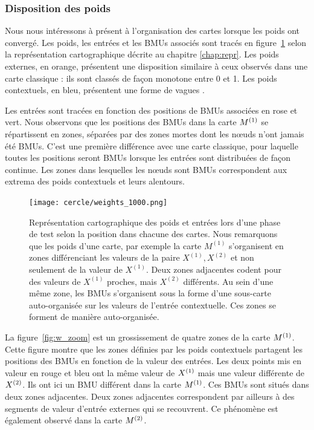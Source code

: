 \documentclass[../main]{subfiles}
\begin{document}
\subsubsection{Disposition des poids}

Nous nous intéressons à présent à l'organisation des cartes lorsque les poids ont convergé.
Les poids, les entrées et les BMUs associés sont tracés en figure~\ref{fig:w} selon la représentation cartographique décrite au chapitre \ref{chap:repr}.
Les poids externes, en orange, présentent une disposition similaire à ceux observés dans une carte classique : ils sont classés de façon monotone entre 0 et 1.
Les poids contextuels, en bleu, présentent une forme de \og vagues \fg{}. 

Les entrées sont tracées en fonction des positions de BMUs associées en rose et vert. 
Nous observons que les positions des BMUs dans la carte $M^{({1})}$ se répartissent en zones, séparées par des zones mortes dont les n\oe{}uds n'ont jamais été BMUs.
C'est une première différence avec une carte classique, pour laquelle toutes les positions seront BMUs lorsque les entrées sont distribuées de façon continue.
Les zones dans lesquelles les n\oe{}uds sont BMUs correspondent aux extrema des poids contextuels et leurs alentours.

\begin{figure}[h!]
	\centering\texttt{[image: cercle/weights\_1000.png]}
	\caption{Représentation cartographique des poids et entrées lors d'une phase de test selon la position dans chacune des cartes. Nous remarquons que les poids d'une carte, par exemple la carte $M^{(1)}$ s'organisent en zones différenciant les valeurs de la paire $X^{(1)}, X^{(2)}$ et non seulement de la valeur de $X^{(1)}$. Deux zones adjacentes codent pour des valeurs de $X^{(1)}$ proches, mais $X^{(2)}$ différents. Au sein d'une même zone, les BMUs s'organisent sous la forme d'une sous-carte auto-organisée sur les valeurs de l'entrée contextuelle. Ces zones se forment de manière auto-organisée. \label{fig:w}}
\end{figure}


La figure~\ref{fig:w_zoom} est un grossissement de quatre zones de la carte $M^{({1})}$.
Cette figure montre que les zones définies par les poids contextuels partagent les positions des BMUs en fonction de la valeur des entrées. 
Les deux points mis en valeur en rouge et bleu ont la même valeur de $X^{({1})}$ mais une valeur différente de $X^{({2})}$. Ils ont ici un BMU différent dans la carte $M^{({1})}$. Ces BMUs sont situés dans deux zones adjacentes.
Deux zones adjacentes correspondent par ailleurs à des segments de valeur d'entrée externes qui se recouvrent.
Ce phénomène est également observé dans la carte $M^{({2})}$.
\end{document}
